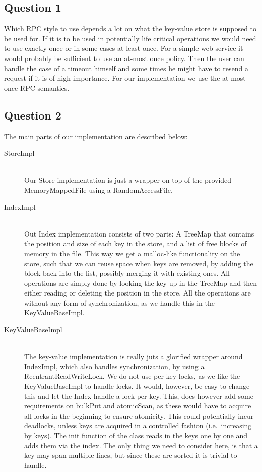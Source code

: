 \documentclass[a4paper,final]{article}
\newcommand{\mono}[1]{{\ttfamily#1}}
\begin{document}
\subsection*{Question 1}
Which RPC style to use depends a lot on what the key-value store is supposed
to be used for. If it is to be used in potentially life critical operations
we would need to use exactly-once or in some cases at-least once. For a simple
web service it would probably be sufficient to use an at-most once policy.
Then the user can handle the case of a timeout himself and some times he might
have to resend a request if it is of high importance. For our implementation we
use the at-most-once RPC semantics.

\subsection*{Question 2}
The main parts of our implementation are described below:

\begin{description}
    \item [\mono{StoreImpl}]\ \\
        Our Store implementation is just a wrapper on top of the provided
        \mono{MemoryMappedFile} using a \mono{RandomAccessFile}.
    \item [\mono{IndexImpl}]\ \\
        Out Index implementation consists of two parts: A \mono{TreeMap} that
        contains the position and size of each key in the store, and a list
        of free blocks of memory in the file. This way we get a
        \mono{malloc}-like functionality on the store, such that we can reuse
        space when keys are removed, by adding the block back into the list,
        possibly merging it with existing ones. All operations are simply done
        by looking the key up in the \mono{TreeMap} and then either reading or
        deleting the position in the store. All the operations are without any
        form of synchronization, as we handle this in the
        \mono{KeyValueBaseImpl}.
    \item [\mono{KeyValueBaseImpl}]\ \\
        The key-value implementation is really juts a glorified wrapper around
        \mono{IndexImpl}, which also handles synchronization, by using a
        \linebreak
        \mono{ReentrantReadWriteLock}. We do not use per-key locks, as we like
        the \mono{KeyValueBaseImpl} to handle locks. It would, however, be easy
        to change this and let the Index handle a lock per key. This, does
        however add some requirements on \mono{bulkPut} and \mono{atomicScan},
        as these would have to acquire all locks in the beginning to ensure
        atomicity. This could potentially incur deadlocks, unless keys are
        acquired in a controlled fashion (i.e.\ increasing by keys).
        The \mono{init} function of the class reads in the keys one by one
        and adds them via the index. The only thing we need to consider here,
        is that a key may span multiple lines, but since these are sorted it
        is trivial to handle.
\end{description}
\end{document}
